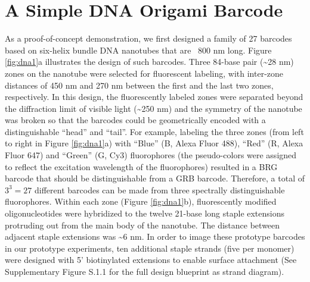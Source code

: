 \section{A Simple DNA Origami Barcode}
As a proof-of-concept demonstration, we first designed a family of 27 barcodes 
based on six-helix bundle DNA nanotubes \citep{douglas_dna-nanotube-induced_2007} that are ~800 nm long. Figure \ref{fig:dna1}a illustrates 
the design of such barcodes. Three 84-base pair (\textasciitilde28 nm) zones on the nanotube were 
selected for fluorescent labeling, with inter-zone distances of 450 nm and 270 nm 
between the first and the last two zones, respectively. In this design, the fluorescently 
labeled zones were separated beyond the diffraction limit of visible light (\textasciitilde250 nm) and 
the symmetry of the nanotube was broken so that the barcodes could be geometrically 
encoded with a distinguishable “head” and “tail”. For example, labeling the three zones 
(from left to right in Figure \ref{fig:dna1}a) with “Blue” (B, Alexa Fluor 488), “Red” (R, Alexa Fluor 
647) and “Green” (G, Cy3) fluorophores (the pseudo-colors were assigned to reflect the 
excitation wavelength of the fluorophores) resulted in a BRG barcode that should be 
distinguishable from a GRB barcode. Therefore, a total of $3^{3}=27$ different barcodes can 
be made from three spectrally distinguishable fluorophores. Within each zone (Figure 
\ref{fig:dna1}b), fluorescently modified oligonucleotides were hybridized to the twelve 21-base long 
staple extensions protruding out from the main body of the nanotube. The distance 
between adjacent staple extensions was \textasciitilde6 nm. In order to image these prototype 
barcodes in our prototype experiments, ten additional staple strands (five per monomer) 
were designed with 5' biotinylated extensions to enable surface attachment (See Supplementary Figure 
S.1.1 for the full design blueprint as strand diagram). 


